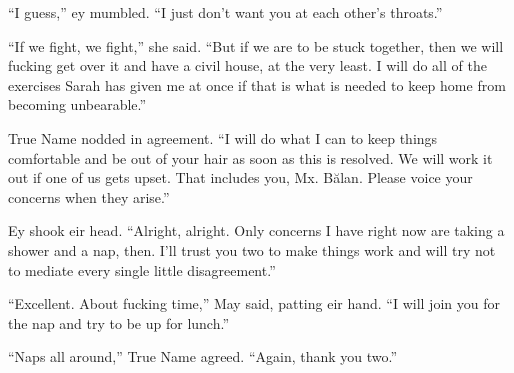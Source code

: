 ``I guess,'' ey mumbled. ``I just don't want you at each other's throats.''

``If we fight, we fight,'' she said. ``But if we are to be stuck together, then we will fucking get over it and have a civil house, at the very least. I will do all of the exercises Sarah has given me at once if that is what is needed to keep home from becoming unbearable.''

True Name nodded in agreement. ``I will do what I can to keep things comfortable and be out of your hair as soon as this is resolved. We will work it out if one of us gets upset. That includes you, Mx. Bălan. Please voice your concerns when they arise.''

Ey shook eir head. ``Alright, alright. Only concerns I have right now are taking a shower and a nap, then. I'll trust you two to make things work and will try not to mediate every single little disagreement.''

``Excellent. About fucking time,'' May said, patting eir hand. ``I will join you for the nap and try to be up for lunch.''

``Naps all around,'' True Name agreed. ``Again, thank you two.''
